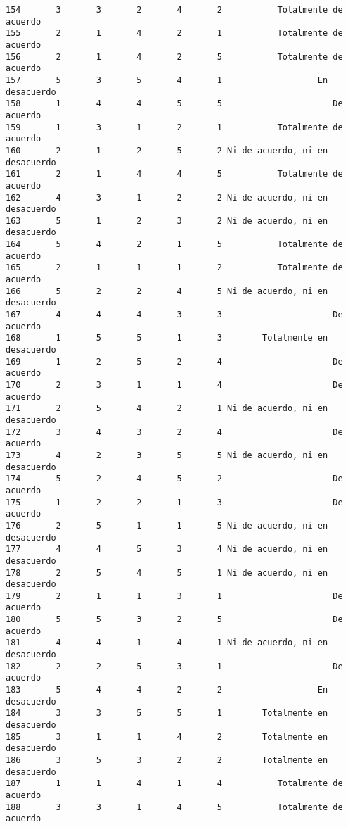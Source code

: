 \documentclass[
  letterpaper,
  DIV=11,
  numbers=noendperiod]{scrartcl}
\begin{document}
\begin{verbatim}
154       3       3       2       4       2           Totalmente de acuerdo
155       2       1       4       2       1           Totalmente de acuerdo
156       2       1       4       2       5           Totalmente de acuerdo
157       5       3       5       4       1                   En desacuerdo
158       1       4       4       5       5                      De acuerdo
159       1       3       1       2       1           Totalmente de acuerdo
160       2       1       2       5       2 Ni de acuerdo, ni en desacuerdo
161       2       1       4       4       5           Totalmente de acuerdo
162       4       3       1       2       2 Ni de acuerdo, ni en desacuerdo
163       5       1       2       3       2 Ni de acuerdo, ni en desacuerdo
164       5       4       2       1       5           Totalmente de acuerdo
165       2       1       1       1       2           Totalmente de acuerdo
166       5       2       2       4       5 Ni de acuerdo, ni en desacuerdo
167       4       4       4       3       3                      De acuerdo
168       1       5       5       1       3        Totalmente en desacuerdo
169       1       2       5       2       4                      De acuerdo
170       2       3       1       1       4                      De acuerdo
171       2       5       4       2       1 Ni de acuerdo, ni en desacuerdo
172       3       4       3       2       4                      De acuerdo
173       4       2       3       5       5 Ni de acuerdo, ni en desacuerdo
174       5       2       4       5       2                      De acuerdo
175       1       2       2       1       3                      De acuerdo
176       2       5       1       1       5 Ni de acuerdo, ni en desacuerdo
177       4       4       5       3       4 Ni de acuerdo, ni en desacuerdo
178       2       5       4       5       1 Ni de acuerdo, ni en desacuerdo
179       2       1       1       3       1                      De acuerdo
180       5       5       3       2       5                      De acuerdo
181       4       4       1       4       1 Ni de acuerdo, ni en desacuerdo
182       2       2       5       3       1                      De acuerdo
183       5       4       4       2       2                   En desacuerdo
184       3       3       5       5       1        Totalmente en desacuerdo
185       3       1       1       4       2        Totalmente en desacuerdo
186       3       5       3       2       2        Totalmente en desacuerdo
187       1       1       4       1       4           Totalmente de acuerdo
188       3       3       1       4       5           Totalmente de acuerdo

\end{verbatim}
\end{document}

